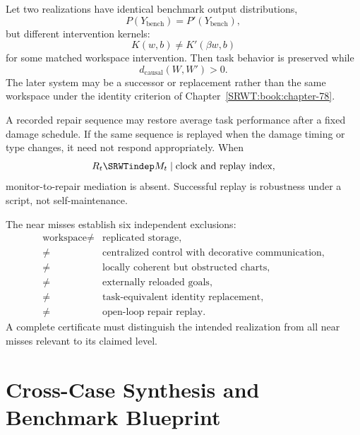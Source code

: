 
Let two realizations have identical benchmark output distributions,
\[
P(Y_{\mathrm{bench}})=P'(Y_{\mathrm{bench}}),
\]
but different intervention kernels:
\[
K(w,b)\neq K'(\beta w,b)
\]
for some matched workspace intervention. Then task behavior is preserved while
\[
d_{\mathrm{causal}}(W,W')>0.
\]
The later system may be a successor or replacement rather than the same
workspace under the identity criterion of Chapter~\ref{SRWT:book:chapter-78}.


A recorded repair sequence may restore average task performance after a fixed
damage schedule. If the same sequence is replayed when the damage timing or
type changes, it need not respond appropriately. When
\[
R_t\SRWTindep M_t\mid\text{clock and replay index},
\]
monitor-to-repair mediation is absent. Successful replay is robustness under a
script, not self-maintenance.


The near misses establish six independent exclusions:
\[
\boxed{
\begin{aligned}
\text{workspace}
\neq{}&\text{replicated storage},\\
\neq{}&\text{centralized control with decorative communication},\\
\neq{}&\text{locally coherent but obstructed charts},\\
\neq{}&\text{externally reloaded goals},\\
\neq{}&\text{task-equivalent identity replacement},\\
\neq{}&\text{open-loop repair replay}.
\end{aligned}
}
\]
A complete certificate must distinguish the intended realization from all
near misses relevant to its claimed level.

\section{Cross-Case Synthesis and Benchmark Blueprint}


